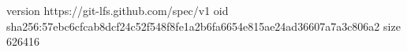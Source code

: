 version https://git-lfs.github.com/spec/v1
oid sha256:57ebc6cfcab8dcf24c52f548f8fe1a2b6fa6654e815ae24ad36607a7a3c806a2
size 626416
